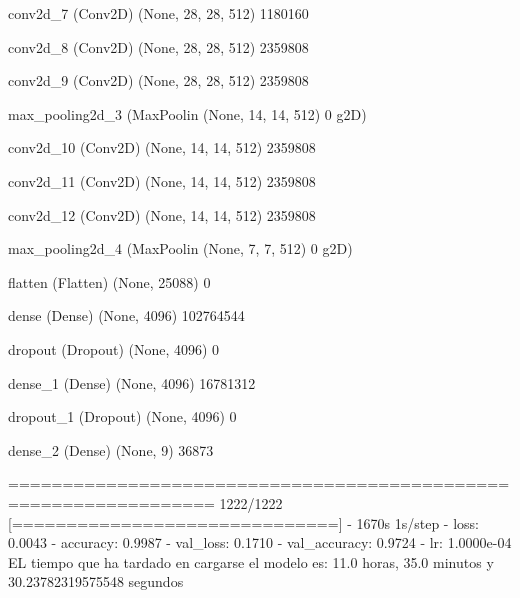 \documentclass[11pt, a4paper]{article} %
\begin{document}
 conv2d_7 (Conv2D)           (None, 28, 28, 512)       1180160   
                                                                 
 conv2d_8 (Conv2D)           (None, 28, 28, 512)       2359808   
                                                                 
 conv2d_9 (Conv2D)           (None, 28, 28, 512)       2359808   
                                                                 
 max_pooling2d_3 (MaxPoolin  (None, 14, 14, 512)       0         
 g2D)                                                            
                                                                 
 conv2d_10 (Conv2D)          (None, 14, 14, 512)       2359808   
                                                                 
 conv2d_11 (Conv2D)          (None, 14, 14, 512)       2359808   
                                                                 
 conv2d_12 (Conv2D)          (None, 14, 14, 512)       2359808   
                                                                 
 max_pooling2d_4 (MaxPoolin  (None, 7, 7, 512)         0         
 g2D)                                                            
                                                                 
 flatten (Flatten)           (None, 25088)             0         
                                                                 
 dense (Dense)               (None, 4096)              102764544 
                                                                 
 dropout (Dropout)           (None, 4096)              0         
                                                                 
 dense_1 (Dense)             (None, 4096)              16781312  
                                                                 
 dropout_1 (Dropout)         (None, 4096)              0         
                                                                 
 dense_2 (Dense)             (None, 9)                 36873     
                                                                 
=================================================================
1222/1222 [==============================] - 1670s 1s/step - loss: 0.0043 - accuracy: 0.9987 - val_loss: 0.1710 - val_accuracy: 0.9724 - lr: 1.0000e-04
EL tiempo que ha tardado en cargarse el modelo es: 11.0 horas, 35.0 minutos y 30.23782319575548 segundos
\end{document}
